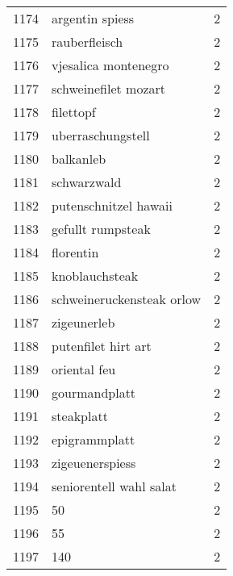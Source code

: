 \begin{tabular}{llr}
1174 &                                    argentin spiess &      2 \\
1175 &                                      rauberfleisch &      2 \\
1176 &                               vjesalica montenegro &      2 \\
1177 &                               schweinefilet mozart &      2 \\
1178 &                                          filettopf &      2 \\
1179 &                                  uberraschungstell &      2 \\
1180 &                                          balkanleb &      2 \\
1181 &                                        schwarzwald &      2 \\
1182 &                              putenschnitzel hawaii &      2 \\
1183 &                                  gefullt rumpsteak &      2 \\
1184 &                                          florentin &      2 \\
1185 &                                     knoblauchsteak &      2 \\
1186 &                          schweineruckensteak orlow &      2 \\
1187 &                                        zigeunerleb &      2 \\
1188 &                                putenfilet hirt art &      2 \\
1189 &                                       oriental feu &      2 \\
1190 &                                      gourmandplatt &      2 \\
1191 &                                         steakplatt &      2 \\
1192 &                                      epigrammplatt &      2 \\
1193 &                                    zigeuenerspiess &      2 \\
1194 &                            seniorentell wahl salat &      2 \\
1195 &                                                 50 &      2 \\
1196 &                                                 55 &      2 \\
1197 &                                                140 &      2 \\

\end{tabular}
